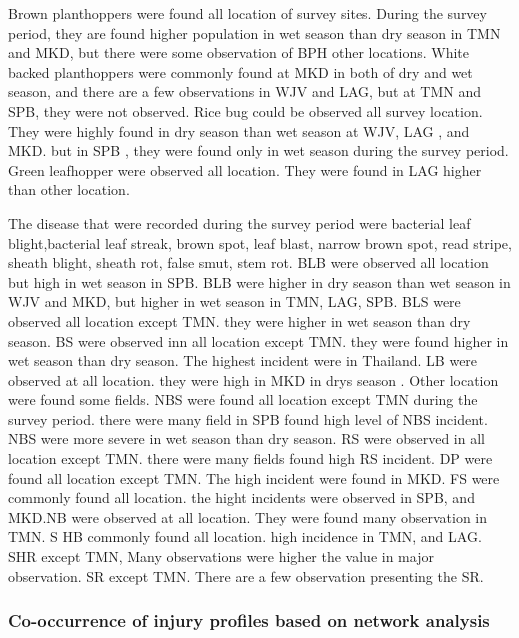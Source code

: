 Brown planthoppers were  found all location of survey sites. During the survey period, they are found higher population in wet season than dry season in TMN and MKD, but  there were some observation of BPH other locations. White backed planthoppers were commonly found at MKD in both of dry and wet season, and there are a few observations in WJV and LAG, but at TMN and SPB, they were not observed. Rice bug could be observed all survey location. They were highly found in dry season than wet season at WJV, LAG , and MKD. but in SPB , they were found only in wet season during the survey period.  Green leafhopper were observed all location. They were found in LAG higher than other location.


The disease that were recorded during the survey period were bacterial leaf blight,bacterial leaf streak, brown spot, leaf blast, narrow brown spot, read stripe, sheath blight, sheath rot, false smut, stem rot. BLB were observed all location but high in wet season in SPB.  BLB were higher in dry season than wet season in WJV and MKD, but higher in  wet season in TMN, LAG, SPB. BLS were observed  all location except TMN. they were higher in wet season than dry season. BS were observed inn all location except TMN. they were found higher in wet season than dry season. The highest incident were in Thailand. LB were observed at all location. they were high in MKD in drys season . Other location were found some fields. NBS were found all location except TMN during the survey period. there were many field in SPB found high level of NBS incident. NBS were more severe in wet season than dry season. RS were observed in all location except TMN. there were many fields found high RS incident. 
DP were found all location except TMN. The high incident were found in MKD. FS were commonly found all location. the hight incidents were observed in SPB, and MKD.NB were observed  at all location. They were found many observation in TMN. S HB commonly found all location.  high incidence in TMN, and LAG.  SHR except TMN, Many observations were higher the value in major observation. SR except TMN. There are a few observation presenting the SR. 






\subsubsection*{Co-occurrence of injury profiles based on network analysis}


